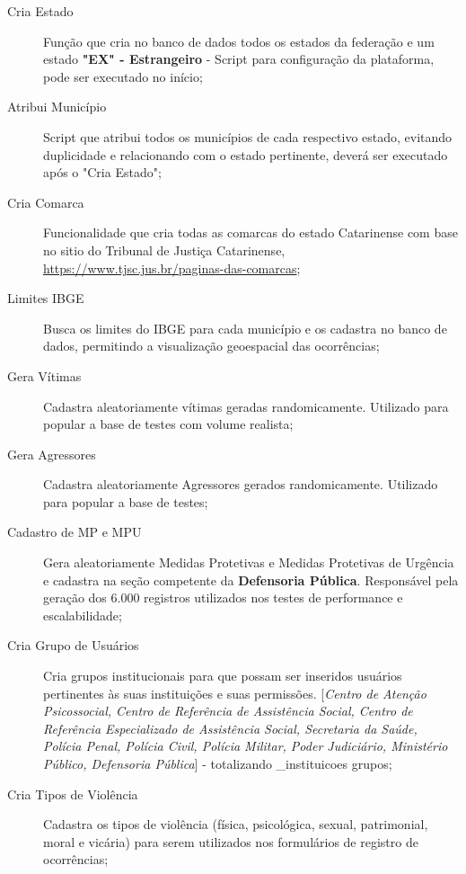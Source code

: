 \begin{description}
   \item [Cria Estado] Função que cria no banco de dados todos os estados da federação e um estado \textbf{"EX" - Estrangeiro} - Script para configuração da plataforma, pode ser executado no início;
   \item [Atribui Município] Script que atribui todos os municípios de cada respectivo estado, evitando duplicidade e relacionando com o estado pertinente, deverá ser executado após o "Cria Estado";
   \item [Cria Comarca] Funcionalidade que cria todas as comarcas do estado Catarinense com base no sitio do Tribunal de Justiça Catarinense, \href{https://www.tjsc.jus.br/paginas-das-comarcas}{https://www.tjsc.jus.br/paginas-das-comarcas};
   \item [Limites IBGE] Busca os limites do IBGE para cada município e os cadastra no banco de dados, permitindo a visualização geoespacial das ocorrências;
   \item [Gera Vítimas] Cadastra aleatoriamente vítimas geradas randomicamente. Utilizado para popular a base de testes com volume realista;
   \item [Gera Agressores] Cadastra aleatoriamente Agressores gerados randomicamente. Utilizado para popular a base de testes;
   \item [Cadastro de MP e MPU] Gera aleatoriamente Medidas Protetivas e Medidas Protetivas de Urgência e cadastra na seção competente da \textbf{Defensoria Pública}. Responsável pela geração dos 6.000 registros utilizados nos testes de performance e escalabilidade;
   \item [Cria Grupo de Usuários] Cria grupos institucionais para que possam ser inseridos usuários pertinentes às suas instituições e suas permissões. [\textit{Centro de Atenção Psicossocial, Centro de Referência de Assistência Social, Centro de Referência Especializado de Assistência Social, Secretaria da Saúde, Polícia Penal, Polícia Civil, Polícia Militar, Poder Judiciário, Ministério Público, Defensoria Pública}] - totalizando \numero_instituicoes{} grupos;
   \item [Cria Tipos de Violência] Cadastra os tipos de violência (física, psicológica, sexual, patrimonial, moral e vicária) para serem utilizados nos formulários de registro de ocorrências;
\end{description}


